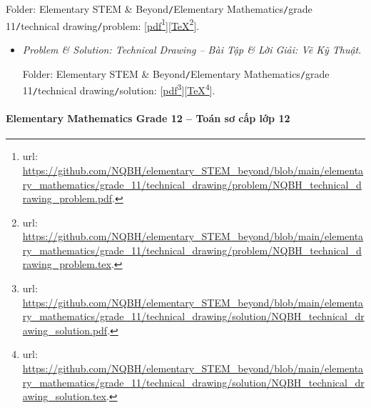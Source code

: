 \documentclass[12pt]{article}
\begin{document}
\begin{itemize}
	Folder: {\sf Elementary STEM \& Beyond{\tt/}Elementary Mathematics{\tt/}grade 11{\tt/}technical drawing{\tt/}problem}: [\href{https://github.com/NQBH/elementary_STEM_beyond/blob/main/elementary_mathematics/grade_11/technical_drawing/problem/NQBH_technical_drawing_problem.pdf}{pdf}\footnote{{\sc url}: \url{https://github.com/NQBH/elementary_STEM_beyond/blob/main/elementary_mathematics/grade_11/technical_drawing/problem/NQBH_technical_drawing_problem.pdf}.}][\href{https://github.com/NQBH/elementary_STEM_beyond/blob/main/elementary_mathematics/grade_11/technical_drawing/problem/NQBH_technical_drawing_problem.tex}{\TeX}\footnote{{\sc url}: \url{https://github.com/NQBH/elementary_STEM_beyond/blob/main/elementary_mathematics/grade_11/technical_drawing/problem/NQBH_technical_drawing_problem.tex}.}].
	\begin{itemize}
		\item {\it Problem \& Solution: Technical Drawing -- Bài Tập \& Lời Giải: Vẽ Kỹ Thuật}.
		
		Folder: {\sf Elementary STEM \& Beyond{\tt/}Elementary Mathematics{\tt/}grade 11{\tt/}technical drawing{\tt/}solution}: [\href{https://github.com/NQBH/elementary_STEM_beyond/blob/main/elementary_mathematics/grade_11/technical_drawing/solution/NQBH_technical_drawing_solution.pdf}{pdf}\footnote{{\sc url}: \url{https://github.com/NQBH/elementary_STEM_beyond/blob/main/elementary_mathematics/grade_11/technical_drawing/solution/NQBH_technical_drawing_solution.pdf}.}][\href{https://github.com/NQBH/elementary_STEM_beyond/blob/main/elementary_mathematics/grade_11/technical_drawing/solution/NQBH_technical_drawing_solution.tex}{\TeX}\footnote{{\sc url}: \url{https://github.com/NQBH/elementary_STEM_beyond/blob/main/elementary_mathematics/grade_11/technical_drawing/solution/NQBH_technical_drawing_solution.tex}.}].
	\end{itemize}
\end{itemize}

\paragraph{Elementary Mathematics Grade 12 -- Toán sơ cấp lớp 12}
\end{document}
